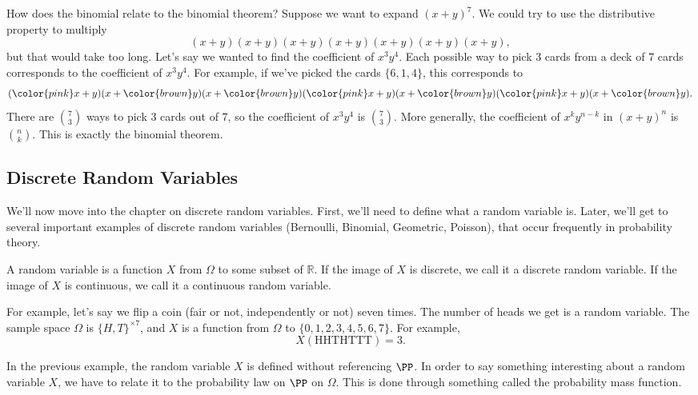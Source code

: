 \documentclass{ximera}
\begin{document}
How does the binomial relate to the binomial theorem? Suppose we want to expand $(x+y)^7$. We could try to use the distributive property to multiply
$$
(x+y)(x+y)(x+y)(x+y)(x+y)(x+y)(x+y),
$$
but that would take too long. Let's say we wanted to find the coefficient of $x^3y^4$. Each possible way to pick $3$ cards from a deck of $7$ cards corresponds to the coefficient of $x^3y^4$. For example, if we've picked the cards $\{6,1,4\}$, this corresponds to 
$$
({\color{pink}x}+y)(x+{\color{brown}y})(x+{\color{brown}y})({\color{pink}x}+y)(x+{\color{brown}y})({\color{pink}x}+y)(x+{\color{brown}y}).
$$
There are $\binom{7}{3}$ ways to pick $3$ cards out of $7$, so the coefficient of $x^3y^4$ is $\binom{7}{3}$.  More generally, the coefficient of  $x^ky^{n-k}$ in $(x+y)^n$ is $\binom{n}{k}$.  This is exactly the binomial theorem.

\subsection{Discrete Random Variables}

We'll now move into the chapter on discrete random variables. First, we'll need to define what a random variable is. Later, we'll get to several important examples of discrete random variables (Bernoulli, Binomial, Geometric, Poisson), that occur frequently in probability theory. 

\begin{definition}
A random variable is a function $X$ from $\Omega$ to some subset of $\mathbb{R}$. If the image of $X$ is discrete, we call it a discrete random variable. If the image of $X$ is continuous, we call it a continuous random variable.
\end{definition}

For example, let's say we flip a coin (fair or not, independently or not) seven times. The number of heads we get is a random variable. The sample space $\Omega$ is $\{H,T\}^{\times 7}$, and $X$ is a function from $\Omega$ to $\{0,1,2,3,4,5,6,7\}$. For example,
$$
X(\text{HHTHTTT})=3.
$$

In the previous example, the random variable $X$ is defined without referencing $\PP$. In order to say something interesting about a random variable $X$, we have to relate it to the probability law on $\PP$ on $\Omega$. This is done through something called the probability mass function.
\end{document}
